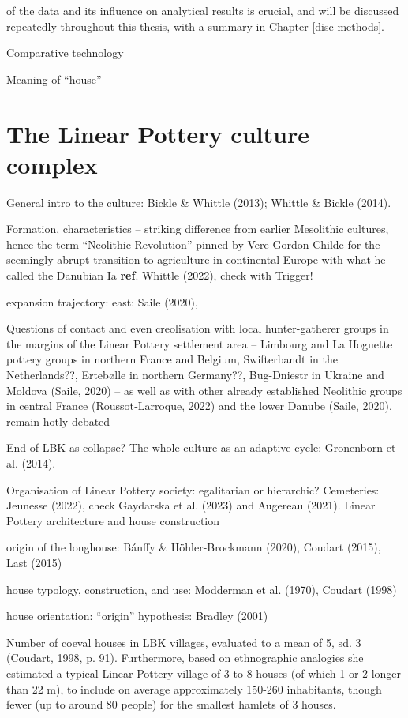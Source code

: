 \documentclass[
  12pt,
]{book}
\begin{document}
of the data and its influence on analytical results is crucial, and will be discussed repeatedly throughout this thesis, with a summary in Chapter \ref{disc-methods}.

Comparative technology

Meaning of ``house''

\hypertarget{lbk}{%
\section{The Linear Pottery culture complex}\label{lbk}}

General intro to the culture: Bickle \& Whittle (2013); Whittle \& Bickle (2014).

Formation, characteristics -- striking difference from earlier Mesolithic cultures, hence the term ``Neolithic Revolution'' pinned by Vere Gordon Childe for the seemingly abrupt transition to agriculture in continental Europe with what he called the Danubian Ia \textbf{ref}. Whittle (2022), check with Trigger!

expansion trajectory: east: Saile (2020),

Questions of contact and even creolisation with local hunter-gatherer groups in the margins of the Linear Pottery settlement area -- Limbourg and La Hoguette pottery groups in northern France and Belgium, Swifterbandt in the Netherlands??, Ertebølle in northern Germany??, Bug-Dniestr in Ukraine and Moldova (Saile, 2020) -- as well as with other already established Neolithic groups in central France (Roussot‑Larroque, 2022) and the lower Danube (Saile, 2020), remain hotly debated

End of LBK as collapse? The whole culture as an adaptive cycle: Gronenborn et al. (2014).

Organisation of Linear Pottery society: egalitarian or hierarchic? Cemeteries: Jeunesse (2022), check Gaydarska et al. (2023) and Augereau (2021). Linear Pottery architecture and house construction

origin of the longhouse: Bánffy \& Höhler-Brockmann (2020), Coudart (2015), Last (2015)

house typology, construction, and use: Modderman et al. (1970), Coudart (1998)

house orientation: ``origin'' hypothesis: Bradley (2001)

Number of coeval houses in LBK villages, evaluated to a mean of 5, sd. 3 (Coudart, 1998, p. 91). Furthermore, based on ethnographic analogies she estimated a typical Linear Pottery village of 3 to 8 houses (of which 1 or 2 longer than 22 m), to include on average approximately 150-260 inhabitants, though fewer (up to around 80 people) for the smallest hamlets of 3 houses.
\end{document}
